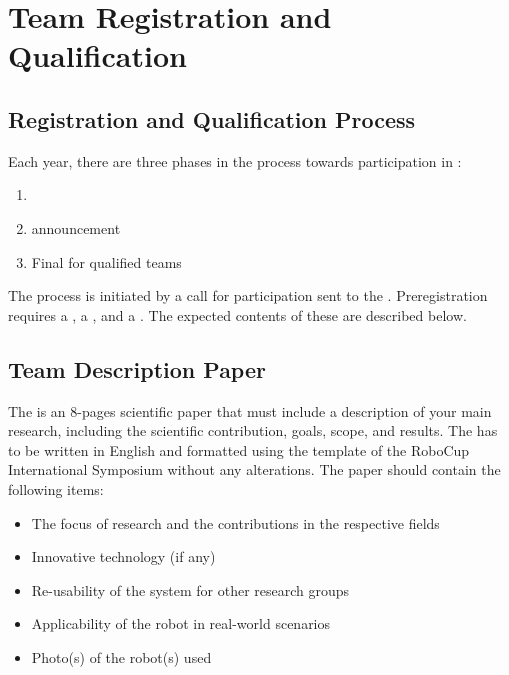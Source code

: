 \section{Team Registration and Qualification}


\subsection{Registration and Qualification Process}
\label{rule:participation}

Each year, there are three phases in the process towards participation in \AtHome:
\begin{enumerate}
	\item {}
	\item {} announcement
	\item Final  for qualified teams
\end{enumerate}
The  process is initiated by a call for participation sent to the .
Preregistration requires a , a , and a .
The expected contents of these are described below.

\subsection{Team Description Paper}\label{rule:website_tdp}

The \TDP{} is an 8-pages scientific paper that must include a description of your main research, including the scientific contribution, goals, scope, and results.
The \TDP{} has to be written in English and formatted using the template of the RoboCup International Symposium without any alterations.
The paper should contain the following items:
\begin{itemize}
	\item The focus of research and the contributions in the respective fields
	\item Innovative technology (if any)
	\item Re-usability of the system for other research groups
	\item Applicability of the robot in real-world scenarios
	\item Photo(s) of the robot(s) used
\end{itemize}

